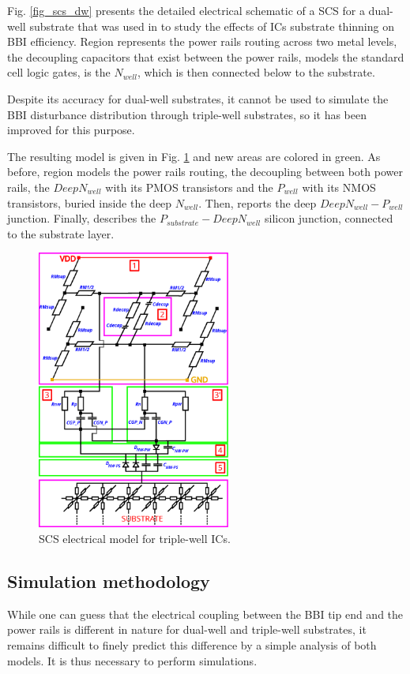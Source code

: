 \documentclass[10pt, conference, compsocconf]{IEEEtran}
\begin{document}
Fig. \ref{fig_scs_dw} presents the detailed electrical schematic of a SCS for a dual-well substrate that was used in \cite{mybbi} to study the effects of ICs substrate thinning on BBI efficiency. Region  represents the power rails routing across two metal levels,  the decoupling capacitors that exist between the power rails,  models the standard cell logic gates,  is the $N_{well}$, which is then connected below to the substrate.

Despite its accuracy for dual-well substrates, it cannot be used to simulate the BBI disturbance distribution through triple-well substrates, so it has been improved for this purpose.

The resulting model is given in Fig. \ref{fig_scs_tw} and new areas are colored in green. As before, region  models the power rails routing,  the decoupling between both power rails,  the $Deep N_{well}$ with its PMOS transistors and  the $P_{well}$ with its NMOS transistors, buried inside the deep $N_{well}$. Then,  reports the deep $Deep N_{well}-P_{well}$ junction. Finally,  describes the $P_{substrate}-Deep N_{well}$ silicon junction, connected to the substrate layer.

\begin{figure}[!t]
\centering
\includegraphics[width=2.5in]{SCS_TW.eps}
\caption{SCS electrical model for triple-well ICs.}
\label{fig_scs_tw}
\end{figure}

\subsection{Simulation methodology}
While one can guess that the electrical coupling between the BBI tip end and the power rails is different in nature for dual-well and triple-well substrates, it remains difficult to finely predict this difference by a simple analysis of both models. It is thus necessary to perform simulations.
\end{document}
